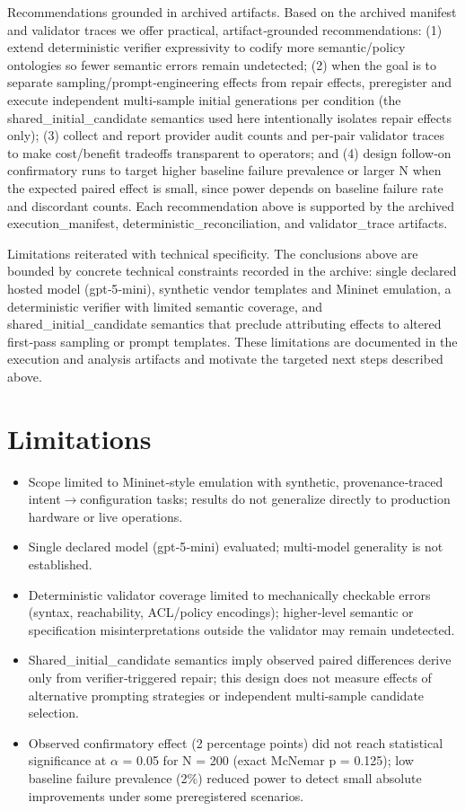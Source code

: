 \documentclass[conference]{IEEEtran}
\begin{document}
Recommendations grounded in archived artifacts. Based on the archived manifest and validator traces we offer practical, artifact‑grounded recommendations: (1) extend deterministic verifier expressivity to codify more semantic/policy ontologies so fewer semantic errors remain undetected; (2) when the goal is to separate sampling/prompt‑engineering effects from repair effects, preregister and execute independent multi‑sample initial generations per condition (the shared\_initial\_candidate semantics used here intentionally isolates repair effects only); (3) collect and report provider audit counts and per‑pair validator traces to make cost/benefit tradeoffs transparent to operators; and (4) design follow‑on confirmatory runs to target higher baseline failure prevalence or larger N when the expected paired effect is small, since power depends on baseline failure rate and discordant counts. Each recommendation above is supported by the archived execution\_manifest, deterministic\_reconciliation, and validator\_trace artifacts.

Limitations reiterated with technical specificity. The conclusions above are bounded by concrete technical constraints recorded in the archive: single declared hosted model (gpt‑5‑mini), synthetic vendor templates and Mininet emulation, a deterministic verifier with limited semantic coverage, and shared\_initial\_candidate semantics that preclude attributing effects to altered first‑pass sampling or prompt templates. These limitations are documented in the execution and analysis artifacts and motivate the targeted next steps described above.

\section{Limitations}
\begin{itemize}
\item Scope limited to Mininet‑style emulation with synthetic, provenance‑traced intent\ensuremath{\rightarrow}configuration tasks; results do not generalize directly to production hardware or live operations.
\item Single declared model (gpt‑5‑mini) evaluated; multi‑model generality is not established.
\item Deterministic validator coverage limited to mechanically checkable errors (syntax, reachability, ACL/policy encodings); higher‑level semantic or specification misinterpretations outside the validator may remain undetected.
\item Shared\_initial\_candidate semantics imply observed paired differences derive only from verifier‑triggered repair; this design does not measure effects of alternative prompting strategies or independent multi‑sample candidate selection.
\item Observed confirmatory effect (2 percentage points) did not reach statistical significance at \ensuremath{\alpha} = 0.05 for N = 200 (exact McNemar p = 0.125); low baseline failure prevalence (2\%) reduced power to detect small absolute improvements under some preregistered scenarios.
\end{itemize}
\end{document}
